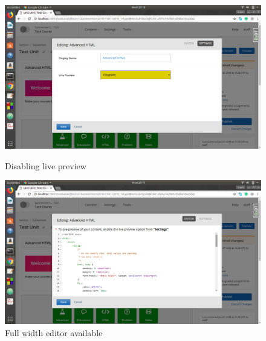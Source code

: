 \begin{figure}[ht]
  \centering
  \includegraphics[width=\textwidth]{images/demo_5}
  \caption{Disabling live preview}

  \vspace*{\floatsep}

  \includegraphics[width=\textwidth]{images/demo_6}
  \caption{Full width editor available}
\end{figure}

